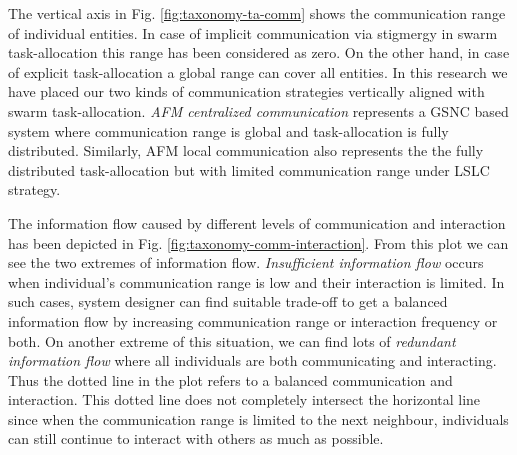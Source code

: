 \documentclass[journal]{IEEEtran}
\begin{document}
The vertical axis in Fig. \ref{fig:taxonomy-ta-comm} shows the communication range of individual entities. In case of implicit communication via stigmergy in swarm task-allocation this range has been considered as zero. On the other hand, in case of explicit task-allocation a global range can cover all entities. In this research we have placed our two kinds of communication strategies vertically aligned with swarm task-allocation. \textit{AFM centralized communication} represents a GSNC based system where communication range is global and task-allocation is fully distributed. Similarly, AFM local communication also represents the the fully distributed task-allocation but with limited communication range under LSLC strategy.

The information flow caused by different levels of communication and interaction has been depicted in Fig. \ref{fig:taxonomy-comm-interaction}. %
From this plot we can see the two extremes of information flow. \textit{Insufficient information flow} occurs when individual's communication range is low and their interaction is limited. In such cases, system designer can find suitable trade-off to get a balanced information flow by increasing  communication range or interaction frequency or both.   On another extreme of this situation, we can find lots of \textit{redundant information flow} where all individuals are both communicating and interacting. Thus the dotted line in the plot refers to a balanced communication and  interaction. This dotted line does not completely intersect the horizontal line since when the communication range is limited to the next neighbour, individuals can still continue to interact with others as much as possible. 
\end{document}
